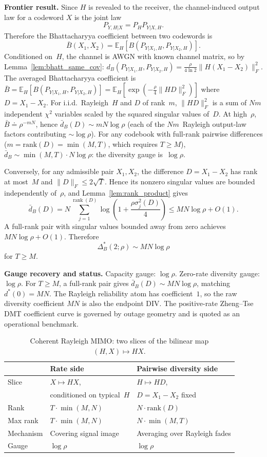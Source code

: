 \documentclass[lettersize,onecolumn]{IEEEtran}
\newcommand{\E}{\mathbb{E}}
\newcommand{\snr}{\rho}
\begin{document}
\textbf{Frontier result.}
Since $H$ is revealed to the receiver, the channel-induced output law
for a codeword $X$ is the joint law
\[
    P_{Y,H|X}=P_H P_{Y|X,H}.
\]
Therefore the Bhattacharyya coefficient between two codewords is
\[
    \bar B(X_1,X_2)
    =
    \E_H
    \left[
        B(P_{Y|X_1,H},P_{Y|X_2,H})
    \right].
\]
Conditioned on~$H$, the channel is AWGN with known channel matrix,
so by Lemma~\ref{lem:bhatt_same_cov}:
$d_B(P_{Y|X_1,H},P_{Y|X_2,H})
= \frac{\snr}{4\ln 2}\|H(X_1-X_2)\|_F^2$.
The averaged Bhattacharyya coefficient is
$\bar{B} = \E_H[B(P_{Y|X_1,H},P_{Y|X_2,H})]
= \E_H[\exp(-\frac{\snr}{4}\|HD\|_F^2)]$
where $D = X_1-X_2$.
For i.i.d.\ Rayleigh~$H$ and $D$ of rank~$m$,
$\|HD\|_F^2$ is a sum of $Nm$ independent $\chi^2$
variables scaled by the squared singular values of~$D$. At
high~$\snr$, $\bar{B} \doteq \snr^{-mN}$, hence
$\bar{d}_B(D) \sim m N\log\snr$
(each of the $Nm$~Rayleigh output-law factors contributing
$\sim\log\snr$).
For any codebook with full-rank pairwise differences
($m = \mathrm{rank}(D) = \min(M,T)$, which requires $T \ge M$),
$\bar{d}_B \sim \min(M,T)\cdot N\log\snr$: the diversity gauge
is~$\log\snr$.

Conversely, for any admissible pair $X_1,X_2$, the difference
$D=X_1-X_2$ has rank at most~$M$ and
$\|D\|_F\le 2\sqrt{T}$. Hence its nonzero singular values are
bounded independently of~$\snr$, and Lemma~\ref{lem:rank_product}
gives
\[
    \bar{d}_B(D)
    =
    N\sum_{j=1}^{\operatorname{rank}(D)}
    \log\!\left(1+\frac{\snr\sigma_j^2(D)}{4}\right)
    \le MN\log\snr+O(1).
\]
A full-rank pair with singular values bounded away from zero achieves
$MN\log\snr+O(1)$. Therefore
\[
    \Delta_B^*(2;\snr)\sim MN\log\snr
\]
for $T\ge M$.

\textbf{Gauge recovery and status.}
Capacity gauge: $\log\snr$. Zero-rate diversity gauge:
$\log\snr$. For $T \ge M$, a full-rank pair gives
$\bar{d}_B(D) \sim MN\log\snr$, matching $d^*(0) = MN$. The
Rayleigh reliability atom has coefficient~$1$, so the raw diversity
coefficient $MN$ is also the endpoint DIV\@. The positive-rate
Zheng--Tse DMT coefficient curve is governed by outage geometry and
is quoted as an operational benchmark.

\begin{table}[t]
\centering
\caption{Coherent Rayleigh MIMO: two slices of the bilinear
map $(H,X) \mapsto HX$.}
\label{tab:coh_rayleigh}
\small
\begin{tabular}{@{}p{1.6cm}p{3.1cm}p{3.1cm}@{}}
\toprule
& Rate side & Pairwise diversity side \\
\midrule
Slice & $X \mapsto HX$, & $H \mapsto HD$, \\
      & conditioned on typical~$H$ & $D = X_1\!-\!X_2$ fixed \\
Rank  & $T\!\cdot\!\min(M,N)$ &
$N\!\cdot\!\mathrm{rank}(D)$ \\
Max rank & $T\!\cdot\!\min(M,N)$ &
$N\!\cdot\!\min(M,T)$ \\
Mechanism & Covering signal image &
Averaging over Rayleigh fades \\
Gauge & $\log\snr$ & $\log\snr$ \\
\bottomrule
\end{tabular}
\end{table}
\end{document}
